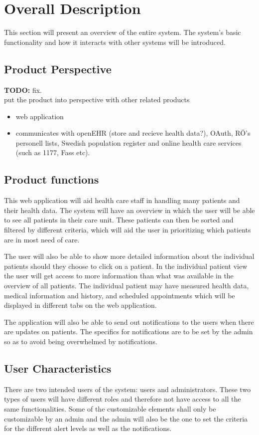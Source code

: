 \documentclass{scrreprt}
\begin{document}
\chapter{Overall Description}
This section will present an overview of the entire system. The system's basic functionality and how it interacts with other systems will be introduced. %

\section{Product Perspective}
\textbf{TODO:} fix. \\ put the product into perspective with other related products
\begin{itemize}
    \item web application
    \item communicates with openEHR (store and recieve health data?), OAuth, RÖ's personell lists, Swedish population register and online health care services (such as 1177, Fass etc).
\end{itemize}


\section{Product functions}
This web application will aid health care staff in handling many patients and their health data. The system will have an overview in which the user will be able to see all patients in their care unit. These patients can then be sorted and filtered by different criteria, which will aid the user in prioritizing which patients are in most need of care. 


The user will also be able to show more detailed information about the individual patients should they choose to click on a patient. In the individual patient view the user will get access to more information than what was available in the overview of all patients. The individual patient may have measured health data, medical information and history, and scheduled appointments which will be displayed in different tabs on the web application.


The application will also be able to send out notifications to the users when there are updates on patients. The specifics for notifications are to be set by the admin so as to avoid being overwhelmed by notifications. 

\section{User Characteristics}
There are two intended users of the system: users and administrators. These two types of users will have different roles and therefore not have access to all the same functionalities. Some of the customizable elements shall only be customizable by an admin and the admin will also be the one to set the criteria for the different alert levels as well as the notifications.
\end{document}
